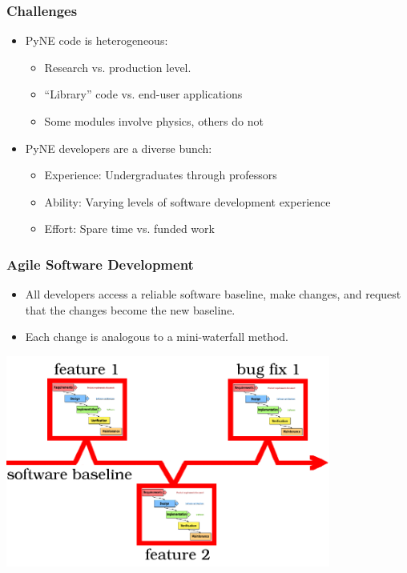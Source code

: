 \documentclass[12pt]{beamer}
\begin{document}
\begin{frame}[fragile]
\frametitle{Challenges}

\begin{itemize}
\item{PyNE code is heterogeneous:}
    \begin{itemize}
    \item{Research vs. production level.}
    \item{``Library'' code vs. end-user applications}
    \item{Some modules involve physics, others do not}
    \end{itemize}
\item{PyNE developers are a diverse bunch}:
   \begin{itemize}
   \item{Experience: Undergraduates through professors}
   \item{Ability: Varying levels of software development experience}
   \item{Effort: Spare time vs. funded work}
   \end{itemize}
\end{itemize}

\end{frame}
\begin{frame}
\frametitle{Agile Software Development\cite{larman2004agile}}

\begin{itemize}
\item{All developers access a reliable software baseline, make changes, and request that the changes become the new baseline.}
\item{Each change is analogous to a mini-waterfall method.}
\end{itemize}

\centerline{\includegraphics[width=0.8\textwidth]{figures/agile.png}}

\end{frame}
\end{document}
